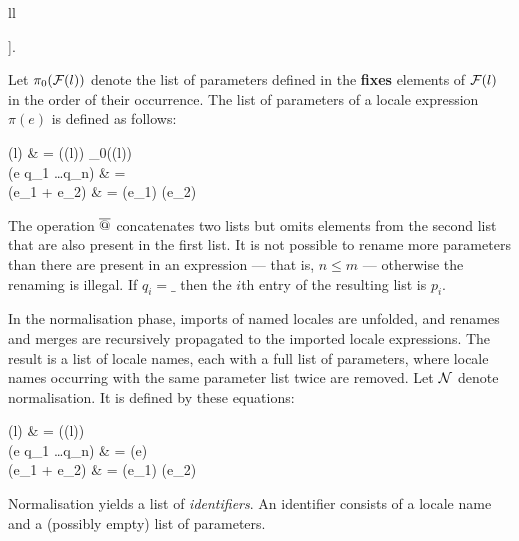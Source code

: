 \begin{isabellebody}
\begin{isamarkuptext}
\begin{align*%
}
\begin{array}{ll}
\end{array} \right].
\end{align*%
}
  Let $\pi_0(\mathcal{F}(l))$ denote the list of parameters defined in the
  \textbf{fixes} elements of $\mathcal{F}(l)$ in the order of their occurrence.
  The list of parameters of a locale expression $\pi(e)$ is defined as
  follows:
\begin{align*%
}
  \pi(l) & = \pi(\I(l)) \App \pi_0(\F(l))  \\
  \pi(e\: q_1 \ldots q_n) & =  \\
  \pi(e_1 + e_2) & = \pi(e_1) \App \pi(e_2)
\end{align*%
}
  The operation $\mathbin{\overline{@}}$ concatenates two lists but omits elements from
  the second list that are also present in the first list.
  It is not possible to rename more parameters than there
  are present in an expression --- that is, $n \le m$ --- otherwise
  the renaming is illegal.  If $q_i
  = \_$ then the $i$th entry of the resulting list is $p_i$.

  In the normalisation phase, imports of named locales are unfolded, and
  renames and merges are recursively propagated to the imported locale
  expressions.  The result is a list of locale names, each with a full
  list of parameters, where locale names occurring with the same parameter
  list twice are removed.  Let $\mathcal{N}$ denote normalisation.  It is defined
  by these equations:
\begin{align*%
}
  \N(l) & = \N(\I(l)) \App [l\:\pi(l)]  \\
  \N(e\: q_1 \ldots q_n) & = \N(e)\:[q_1 \ldots q_n/\pi(e)] \\
  \N(e_1 + e_2) & = \N(e_1) \App \N(e_2)
\end{align*%
}
  Normalisation yields a list of \emph{identifiers}.  An identifier
  consists of a locale name and a (possibly empty) list of parameters.


\end{isamarkuptext}
\end{isabellebody}
